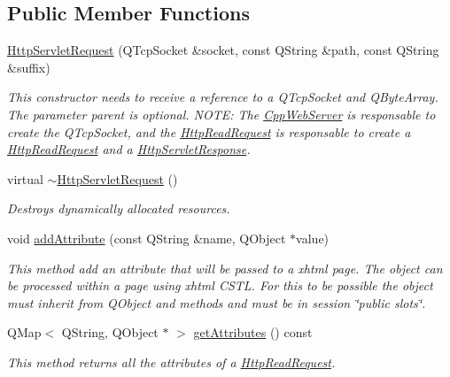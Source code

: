 \subsection*{Public Member Functions}
\begin{DoxyCompactItemize}
\item 
\hyperlink{class_c_w_f_1_1_http_servlet_request_a9fdd1aeaccd42c3043bff902cf6e6e09}{Http\+Servlet\+Request} (Q\+Tcp\+Socket \&socket, const Q\+String \&path, const Q\+String \&suffix)
\begin{DoxyCompactList}\small\item\em This constructor needs to receive a reference to a Q\+Tcp\+Socket and Q\+Byte\+Array. The parameter parent is optional. N\+O\+T\+E\+: The \hyperlink{class_c_w_f_1_1_cpp_web_server}{Cpp\+Web\+Server} is responsable to create the Q\+Tcp\+Socket, and the \hyperlink{class_c_w_f_1_1_http_read_request}{Http\+Read\+Request} is responsable to create a \hyperlink{class_c_w_f_1_1_http_read_request}{Http\+Read\+Request} and a \hyperlink{class_c_w_f_1_1_http_servlet_response}{Http\+Servlet\+Response}. \end{DoxyCompactList}\item 
virtual \hyperlink{class_c_w_f_1_1_http_servlet_request_a41867870bf0c9f23ef74d70b10c0d357}{$\sim$\+Http\+Servlet\+Request} ()
\begin{DoxyCompactList}\small\item\em Destroys dynamically allocated resources. \end{DoxyCompactList}\item 
void \hyperlink{class_c_w_f_1_1_http_servlet_request_ad4777049d7043e62535fa658fd61be1d}{add\+Attribute} (const Q\+String \&name, Q\+Object $\ast$value)
\begin{DoxyCompactList}\small\item\em This method add an attribute that will be passed to a xhtml page. The object can be processed within a page using xhtml C\+S\+T\+L. For this to be possible the object must inherit from Q\+Object and methods and must be in session \char`\"{}public slots\char`\"{}. \end{DoxyCompactList}\item 
Q\+Map$<$ Q\+String, Q\+Object $\ast$ $>$ \hyperlink{class_c_w_f_1_1_http_servlet_request_a3855042c53725e7ef753bee620e01297}{get\+Attributes} () const 
\begin{DoxyCompactList}\small\item\em This method returns all the attributes of a \hyperlink{class_c_w_f_1_1_http_read_request}{Http\+Read\+Request}. \end{DoxyCompactList}\item 

\end{DoxyCompactItemize}
